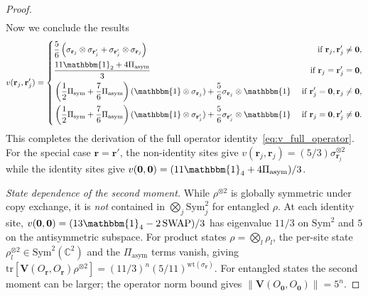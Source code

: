 \documentclass[aps,%
twocolumn,%
floatfix,%
pra,%
amsfonts,%
groupedaddress,%
superscriptaddress]{revtex4-2}%
\newcommand{\1}{\mathbbm{1}}
\begin{document}
\begin{proof}
\begin{align}
    \end{align} 
    Now we conclude the results
    \begin{align}
        v(\mathbf{r}_j, \mathbf{r}_j') = 
        \left\{\begin{aligned}
            &\frac{5}{6}\left(\sigma_{\mathbf{r}_j}\otimes \sigma_{\mathbf{r}'_j} +\sigma_{\mathbf{r}'_j}\otimes \sigma_{\mathbf{r}_j} \right)&\text{~if~} \mathbf{r}_j, \mathbf{r}_j'  \neq \mathbf{0},\\
            &\frac{11\1_2 + 4 \Pi_{\mathrm{asym}}}{3} &\text{~if~} \mathbf{r}_j=\mathbf{r}_j'= \mathbf{0}, \\
            &\left(\frac{1}{2} \Pi_{\mathrm{sym}} + \frac{7}{6} \Pi_{\mathrm{asym}}\right)(\1 \otimes \sigma_{\mathbf{r}_j})+ \frac{5}{6}\sigma_{\mathbf{r}_j}\otimes\1 &\text{~if~} \mathbf{r}_j' = \mathbf{0},  \mathbf{r}_j\neq \mathbf{0},\\
            &\left(\frac{1}{2} \Pi_{\mathrm{sym}} + \frac{7}{6} \Pi_{\mathrm{asym}}\right)(\1 \otimes \sigma_{\mathbf{r}'_j}) + \frac{5}{6}\sigma_{\mathbf{r}'_j}\otimes\1&\text{~if~} \mathbf{r}_j = \mathbf{0},  \mathbf{r}'_j\neq \mathbf{0}.
        \end{aligned}\right.
    \end{align}
    This completes the derivation of the full operator identity~\eqref{eq:v_full_operator}. For the special case $\mathbf{r} = \mathbf{r}'$, the non-identity sites give $v(\mathbf{r}_j,\mathbf{r}_j) = (5/3)\sigma_{\mathbf{r}_j}^{\otimes 2}$ while the identity sites give $v(\mathbf{0},\mathbf{0}) = (11\1_4 + 4\Pi_{\mathrm{asym}})/3$.

    \emph{State dependence of the second moment.} While $\rho^{\otimes 2}$ is globally symmetric under copy exchange, it is \emph{not} contained in $\bigotimes_j \mathrm{Sym}^2_j$ for entangled $\rho$. At each identity site, $v(\mathbf{0},\mathbf{0}) = (13\1_4 - 2\,\mathrm{SWAP})/3$ has eigenvalue $11/3$ on $\mathrm{Sym}^2$ and $5$ on the antisymmetric subspace. For product states $\rho = \bigotimes_l \rho_l$, the per-site state $\rho_l^{\otimes 2} \in \mathrm{Sym}^2(\mathbb{C}^2)$ and the $\Pi_{\mathrm{asym}}$ terms vanish, giving $\mathrm{tr}[\mathbf{V}(O_\mathbf{r},O_\mathbf{r})\rho^{\otimes 2}] = (11/3)^n(5/11)^{\mathrm{wt}(\sigma_\mathbf{r})}$. For entangled states the second moment can be larger; the operator norm bound gives $\|\mathbf{V}(O_\mathbf{0},O_\mathbf{0})\| = 5^n$.
\end{proof}
\end{document}
